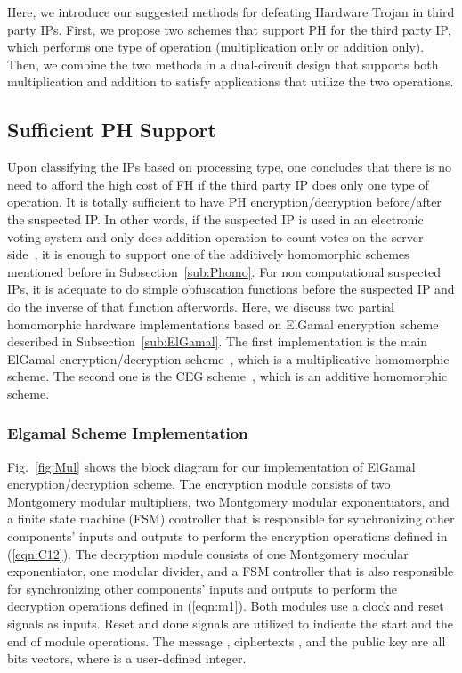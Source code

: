 \documentclass[conference]{IEEEtran}
\begin{document}
Here, we introduce our suggested methods for defeating Hardware Trojan in third party IPs. First, we propose two schemes that support PH for the third party IP, which performs one type of operation (multiplication only or addition only). Then, we combine the two methods in a dual-circuit design that supports both multiplication and addition to satisfy applications that utilize the two operations.  

\subsection{Sufficient PH Support} 


Upon classifying the IPs based on processing type, one concludes that there is no need to afford the high cost of FH if the third party IP does only one type of operation. It is totally sufficient to have PH encryption/decryption before/after the suspected IP. In other words, if the suspected IP is used in an electronic voting system and only does addition operation to count votes on the server side{\color{blue}~\cite{conf:voting}}, it is enough to support one of the additively homomorphic schemes mentioned before in Subsection~\ref{sub:Phomo}. For non computational suspected IPs, it is adequate to do simple obfuscation functions before the suspected IP and do the inverse of that function afterwords. Here, we discuss two partial homomorphic hardware implementations based on ElGamal encryption scheme described in Subsection~\ref{sub:ElGamal}. The first implementation is the main ElGamal encryption/decryption scheme{\color{blue}~\cite{ElGamal85}}, which is a multiplicative homomorphic scheme. The second one is the CEG scheme{\color{blue}~\cite{homoCRT}}, which is an additive homomorphic scheme.  

\subsubsection{\textbf{Elgamal Scheme Implementation}}

Fig.~\ref{fig:Mul} shows the block diagram for our implementation of ElGamal encryption/decryption scheme. The encryption module consists of two Montgomery modular multipliers, two Montgomery modular exponentiators, and a finite state machine (FSM) controller that is responsible for synchronizing other components' inputs and outputs to perform the encryption operations defined in (\ref{eqn:C12}). The decryption module consists of one Montgomery modular exponentiator, one modular divider, and a FSM controller that is also responsible for synchronizing other components' inputs and outputs to perform the decryption operations defined in (\ref{eqn:m1}). Both modules use a clock and reset signals as inputs. Reset and done signals are utilized to indicate the start and the end of module operations. The message , ciphertexts , and the public key  are all  bits vectors, where  is a user-defined integer.   
\end{document}
